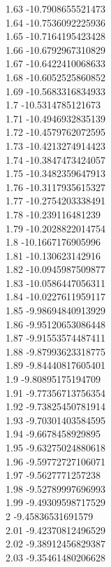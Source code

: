 {1.63	-10.7908655521473\\
1.64	-10.7536092225936\\
1.65	-10.7164195423428\\
1.66	-10.6792967310829\\
1.67	-10.6422410068633\\
1.68	-10.6052525860852\\
1.69	-10.5683316834933\\
1.7	-10.5314785121673\\
1.71	-10.4946932835139\\
1.72	-10.4579762072595\\
1.73	-10.4213274914423\\
1.74	-10.3847473424057\\
1.75	-10.3482359647913\\
1.76	-10.3117935615327\\
1.77	-10.2754203338491\\
1.78	-10.239116481239\\
1.79	-10.2028822014754\\
1.8	-10.1667176905996\\
1.81	-10.130623142916\\
1.82	-10.0945987509877\\
1.83	-10.0586447056311\\
1.84	-10.0227611959117\\
1.85	-9.98694840913929\\
1.86	-9.95120653086448\\
1.87	-9.91553574487411\\
1.88	-9.87993623318775\\
1.89	-9.84440817605401\\
1.9	-9.80895175194709\\
1.91	-9.77356713756354\\
1.92	-9.73825450781914\\
1.93	-9.70301403584595\\
1.94	-9.6678458929895\\
1.95	-9.63275024880618\\
1.96	-9.59772727106071\\
1.97	-9.5627771257238\\
1.98	-9.52789997696993\\
1.99	-9.49309598717529\\
2	-9.45836531691579\\
2.01	-9.42370812496529\\
2.02	-9.38912456829387\\
2.03	-9.35461480206628\\
}
